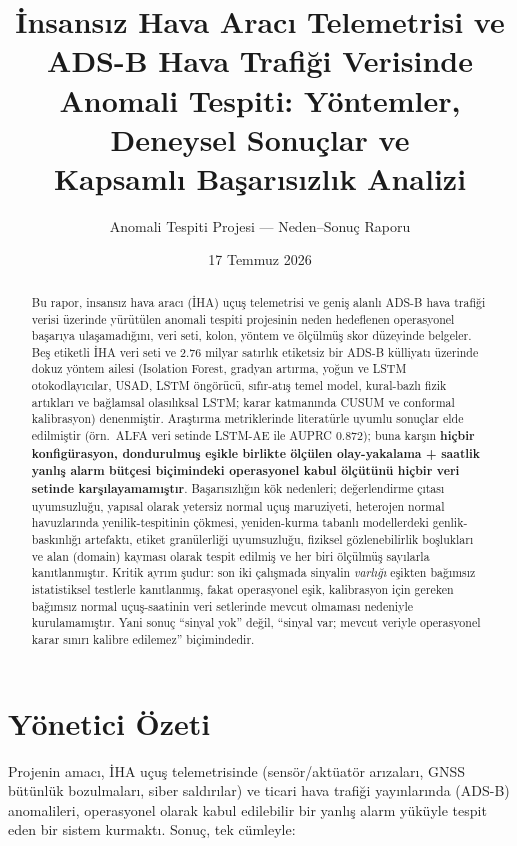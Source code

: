 \documentclass[11pt,a4paper]{article}
\title{İnsansız Hava Aracı Telemetrisi ve ADS-B Hava Trafiği Verisinde\\
Anomali Tespiti: Yöntemler, Deneysel Sonuçlar ve\\
Kapsamlı Başarısızlık Analizi}
\author{Anomali Tespiti Projesi --- Neden--Sonuç Raporu}
\date{17 Temmuz 2026}
\begin{document}
\maketitle

\begin{abstract}
Bu rapor, insansız hava aracı (İHA) uçuş telemetrisi ve geniş alanlı ADS-B hava
trafiği verisi üzerinde yürütülen anomali tespiti projesinin neden hedeflenen
operasyonel başarıya ulaşamadığını, veri seti, kolon, yöntem ve ölçülmüş skor
düzeyinde belgeler. Beş etiketli İHA veri seti ve 2.76 milyar satırlık etiketsiz
bir ADS-B külliyatı üzerinde dokuz yöntem ailesi (Isolation Forest, gradyan
artırma, yoğun ve LSTM otokodlayıcılar, USAD, LSTM öngörücü, sıfır-atış temel
model, kural-bazlı fizik artıkları ve bağlamsal olasılıksal LSTM; karar
katmanında CUSUM ve conformal kalibrasyon) denenmiştir. Araştırma metriklerinde
literatürle uyumlu sonuçlar elde edilmiştir (örn.\ ALFA veri setinde LSTM-AE ile
AUPRC 0.872); buna karşın \textbf{hiçbir konfigürasyon, dondurulmuş eşikle
birlikte ölçülen olay-yakalama + saatlik yanlış alarm bütçesi biçimindeki
operasyonel kabul ölçütünü hiçbir veri setinde karşılayamamıştır}. Başarısızlığın
kök nedenleri; değerlendirme çıtası uyumsuzluğu, yapısal olarak yetersiz normal
uçuş maruziyeti, heterojen normal havuzlarında yenilik-tespitinin çökmesi,
yeniden-kurma tabanlı modellerdeki genlik-baskınlığı artefaktı, etiket
granülerliği uyumsuzluğu, fiziksel gözlenebilirlik boşlukları ve alan (domain)
kayması olarak tespit edilmiş ve her biri ölçülmüş sayılarla kanıtlanmıştır.
Kritik ayrım şudur: son iki çalışmada sinyalin \emph{varlığı} eşikten bağımsız
istatistiksel testlerle kanıtlanmış, fakat operasyonel eşik, kalibrasyon için
gereken bağımsız normal uçuş-saatinin veri setlerinde mevcut olmaması nedeniyle
kurulamamıştır. Yani sonuç ``sinyal yok'' değil, ``sinyal var; mevcut veriyle
operasyonel karar sınırı kalibre edilemez'' biçimindedir.
\end{abstract}

\tableofcontents
\newpage

\section{Yönetici Özeti}

Projenin amacı, İHA uçuş telemetrisinde (sensör/aktüatör arızaları, GNSS
bütünlük bozulmaları, siber saldırılar) ve ticari hava trafiği yayınlarında
(ADS-B) anomalileri, operasyonel olarak kabul edilebilir bir yanlış alarm
yüküyle tespit eden bir sistem kurmaktı. Sonuç, tek cümleyle:
\end{document}
